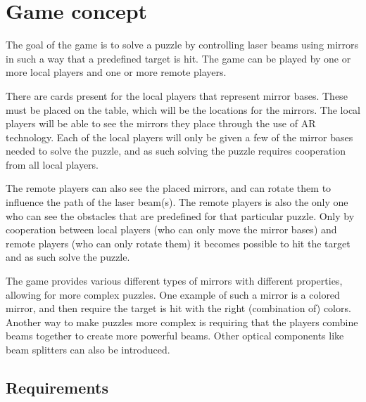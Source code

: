 \section{Game concept}

The goal of the game is to solve a puzzle by controlling laser beams using mirrors
in such a way that a predefined target is hit. The game can be played by 
one or more local players and one or more remote players.

There are cards present for the local players that represent mirror bases. These 
must be placed on the table, which will be the locations for the mirrors. The local
players will be able to see the mirrors they place through the use of AR technology.
Each of the local players will only be given a few of the mirror bases needed to solve
the puzzle, and as such solving the puzzle requires cooperation from all local players.

The remote players can also see the placed mirrors, and can rotate them to influence 
the path of the laser beam(s). The remote players is also the only one who can see the
obstacles that are predefined for that particular puzzle. Only by cooperation between 
local players (who can only move the mirror bases) and remote players (who can only 
rotate them) it becomes possible to hit the target and as such solve the puzzle.

The game provides various different types of mirrors with different properties, 
allowing for more complex puzzles. One example of such a mirror is a colored mirror, 
and then require the target is hit with the right (combination of) colors. Another 
way to make puzzles more complex is requiring that the players combine beams together
to create more powerful beams. Other optical components like beam splitters can
also be introduced.

\subsection{Requirements}

